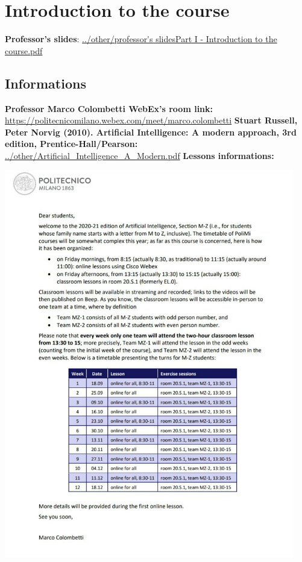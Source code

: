 \section{Introduction to the course}
\textbf{Professor's slides}:\newline
\url{../other/professor's slidesPart I - Introduction to the course.pdf}
\subsection{Informations}
\textbf{Professor Marco Colombetti WebEx's room link:}\newline
\url{https://politecnicomilano.webex.com/meet/marco.colombetti}\newline
\newline
\textbf{Stuart Russell, Peter Norvig (2010). Artificial Intelligence: A modern approach, 3rd edition, Prentice-Hall/Pearson:}\newline
\url{../other/Artificial_Intelligence_A_Modern.pdf}
\newline
\newline
\textbf{Lessons informations:}
\begin{center}
    \includegraphics[height=17cm]{../other/schedule.jpg}
\end{center}
